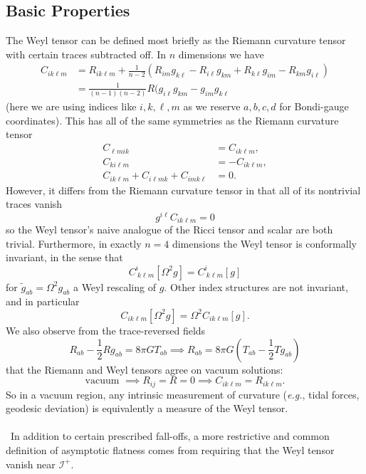 \documentclass[11pt,letterpaper]{article}
\newcommand{\LP}{\left(}
\newcommand{\RP}{\right)}
\begin{document}
\subsection{Basic Properties}
The Weyl tensor can be defined most briefly as the Riemann curvature tensor with certain traces subtracted off. In $n$ dimensions we have \begin{equation}
\begin{aligned}
C_{i k \ell m} & = R_{i k \ell m} + \frac{1}{n-2} (R_{i m} g_{k \ell} - R_{i \ell} g_{k m} + R_{k \ell} g_{i m} - R_{k m} g_{i \ell} ) \\
& = \frac{1}{(n-1)(n-2)} R (g_{i \ell} g_{k m} - g_{i m} g_{k \ell}
\end{aligned}
\end{equation}
(here we are using indices like $i,k,\ell,m$ as we reserve $a,b,c,d$ for Bondi-gauge coordinates). This has all of the same symmetries as the Riemann curvature tensor \begin{equation}
\begin{aligned}
C_{\ell m i k} & = C_{i k \ell m}, \\
C_{k i \ell m} & = - C_{i k \ell m}, \\
C_{i k \ell m} + C_{i \ell m k} + C_{i m k \ell} & = 0.
\end{aligned}
\end{equation}
However, it differs from the Riemann curvature tensor in that all of its nontrivial traces vanish \begin{equation}
g^{i \ell} C_{i k \ell m} = 0
\end{equation}
so the Weyl tensor's naive analogue of the Ricci tensor and scalar are both trivial. Furthermore, in exactly $n = 4$ dimensions the Weyl tensor is conformally invariant, in the sense that \begin{equation}
C^i_{ \ k \ell m}[\Omega^2 g] = C^i_{ \ k \ell m}[g]
\end{equation}
for $\tilde{g}_{ab} = \Omega^2 g_{ab}$ a Weyl rescaling of $g$. Other index structures are not invariant, and in particular \begin{equation}
C_{i k \ell m}[\Omega^2 g] = \Omega^2 C_{i k \ell m} [g] .
\end{equation}
We also observe from the trace-reversed fields \begin{equation}
R_{ab} - \frac{1}{2} R g_{ab} = 8 \pi G T_{ab} \implies R_{ab} = 8 \pi G \LP T_{ab} - \frac{1}{2} T g_{ab} \RP
\end{equation}
that the Riemann and Weyl tensors agree on vacuum solutions: \begin{equation}
\mbox{vacuum } \implies R_{ij} = R = 0 \implies C_{i k \ell m} = R_{i k \ell m}.
\end{equation}
So in a vacuum region, any intrinsic measurement of curvature (\textit{e.g.}, tidal forces, geodesic deviation) is equivalently a measure of the Weyl tensor. \\
\\
\
In addition to certain prescribed fall-offs, a more restrictive and common definition of asymptotic flatness comes from requiring that the Weyl tensor vanish near $\mathcal{I}^+$.





\end{document}
